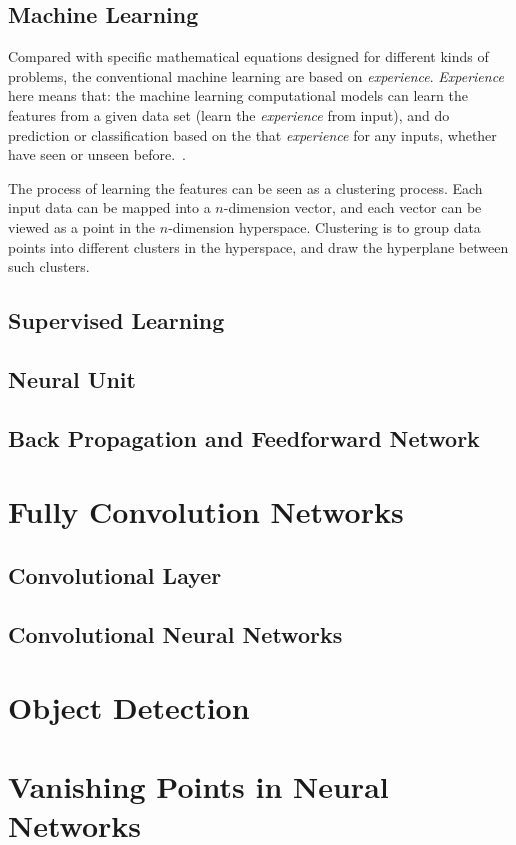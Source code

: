 \begin{spacing}{1.5}
\subsection{Machine Learning}

Compared with specific mathematical equations designed for different kinds of problems, the conventional machine learning are based on \textit{experience}. \textit{Experience} here means that: the machine learning computational models can learn the features from a given data set (learn the \textit{experience} from input), and do prediction or classification based on the that \textit{experience} for any inputs, whether have seen or unseen before.~\cite{mohri2018foundations}.

The process of learning the features can be seen as a clustering process. Each input data can be mapped into a $n$-dimension vector, and each vector can be viewed as a point in the $n$-dimension hyperspace. Clustering is to group data points into different clusters in the hyperspace, and draw the hyperplane between such clusters. 

\subsection{Supervised Learning}

\subsection{Neural Unit}

\subsection{Back Propagation and Feedforward Network}

\section{Fully Convolution Networks}
\label{sec:LR_FCN}

\subsection{Convolutional Layer}

\subsection{Convolutional Neural Networks}

\section{Object Detection}
\label{sec:LR_objectdetection}



\section{Vanishing Points in Neural Networks}
\label{sec:LR_vpinNN}



\end{spacing}
\newpage
